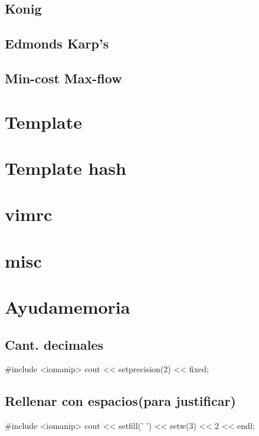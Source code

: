 \subsection{Konig}
\subsection{Edmonds Karp's}
\subsection{Min-cost Max-flow}


\section{Template}%

\section{Template hash}

\section{vimrc}

\section{misc}


\section{Ayudamemoria}%
\subsection*{Cant. decimales} 	
\begin{code}
#include <iomanip>
cout << setprecision(2) << fixed;
\end{code}
\subsection*{Rellenar con espacios(para justificar)}
\begin{code}
#include <iomanip>
cout << setfill(' ') << setw(3) << 2 << endl;
\end{code}
